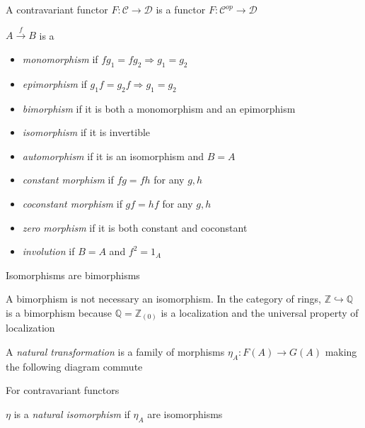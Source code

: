 \documentclass[main]{subfiles}
\begin{document}
\begin{remark}
A contravariant functor $F:\mathscr C\to\mathscr D$ is a functor $F:\mathscr C^{op}\to\mathscr D$
\end{remark}

\begin{definition}
$A\xrightarrow{f}B$ is a
\begin{itemize}
\item \textit{monomorphism} if $fg_1=fg_2\Rightarrow g_1=g_2$
\item \textit{epimorphism} if $g_1f=g_2f\Rightarrow g_1=g_2$
\item \textit{bimorphism} if it is both a monomorphism and an epimorphism
\item \textit{isomorphism} if it is invertible
\item \textit{automorphism} if it is an isomorphism and $B=A$
\item \textit{constant morphism} if $fg=fh$ for any $g,h$
\item \textit{coconstant morphism} if $gf=hf$ for any $g,h$
\item \textit{zero morphism} if it is both constant and coconstant
\item \textit{involution} if $B=A$ and $f^2=1_A$
\end{itemize}
\end{definition}

\begin{remark}
Isomorphisms are bimorphisms
\end{remark}

\begin{example}
A bimorphism is not necessary an isomorphism. In the category of rings, $\mathbb Z\hookrightarrow\mathbb Q$ is a bimorphism because $\mathbb Q=\mathbb Z_{(0)}$ is a localization and the universal property of localization
\end{example}

\begin{definition}
A \textit{natural transformation} is a family of morphisms $\eta_A:F(A)\to G(A)$ making the following diagram commute
\begin{center}
\end{center}
For contravariant functors
\begin{center}
\end{center}
$\eta$ is a \textit{natural isomorphism} if $\eta_A$ are isomorphisms
\end{definition}
\end{document}
